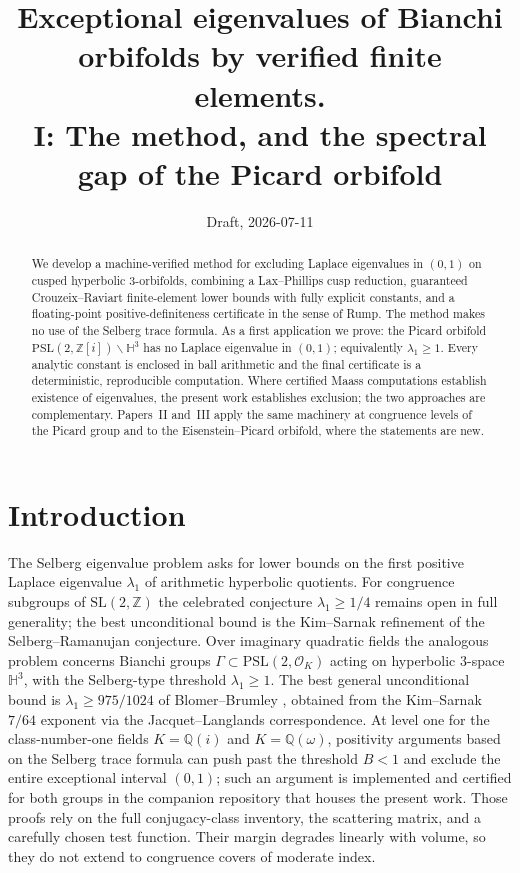 \documentclass[11pt]{amsart}
\title[Verified exclusion of exceptional eigenvalues, I]{Exceptional
eigenvalues of Bianchi orbifolds by verified finite elements.\\
I: The method, and the spectral gap of the Picard orbifold}
\author{}
\date{Draft, 2026-07-11}
\newcommand{\HH}{\mathbb{H}^3}
\newcommand{\ZZ}{\mathbb{Z}}
\newcommand{\PSL}{\mathrm{PSL}}
\begin{document}
\begin{abstract}
We develop a machine-verified method for excluding Laplace eigenvalues
in $(0,1)$ on cusped hyperbolic $3$-orbifolds, combining a
Lax--Phillips cusp reduction, guaranteed Crouzeix--Raviart
finite-element lower bounds with fully explicit constants, and a
floating-point positive-definiteness certificate in the sense of Rump.
The method makes no use of the Selberg trace formula.  As a first
application we prove: the Picard orbifold
$\PSL(2,\ZZ[i])\backslash\HH$ has no Laplace eigenvalue in
$(0,1)$; equivalently $\lambda_1\ge 1$.  Every analytic constant is
enclosed in ball arithmetic and the final certificate is a
deterministic, reproducible computation.  Where certified Maass
computations establish existence of eigenvalues, the present work
establishes exclusion; the two approaches are complementary.  Papers~II
and~III apply the same machinery at congruence levels of the Picard
group and to the Eisenstein--Picard orbifold, where the statements are
new.
\end{abstract}
\maketitle

\section{Introduction}

The Selberg eigenvalue problem asks for lower bounds on the first
positive Laplace eigenvalue $\lambda_1$ of arithmetic hyperbolic
quotients.  For congruence subgroups of $\mathrm{SL}(2,\ZZ)$ the
celebrated conjecture $\lambda_1\ge 1/4$ remains open in full
generality; the best unconditional bound is the Kim--Sarnak refinement
of the Selberg--Ramanujan conjecture.  Over imaginary quadratic fields
the analogous problem concerns Bianchi groups
$\Gamma\subset\PSL(2,\mathcal{O}_K)$ acting on hyperbolic $3$-space
$\HH$, with the Selberg-type threshold $\lambda_1\ge 1$.  The best
general unconditional bound is $\lambda_1\ge 975/1024$ of
Blomer--Brumley \cite{BB11}, obtained from the Kim--Sarnak $7/64$
exponent via the Jacquet--Langlands correspondence.  At level one for
the class-number-one fields $K=\mathbb{Q}(i)$ and $K=\mathbb{Q}(\omega)$,
positivity arguments based on the Selberg trace formula can push past
the threshold $B<1$ and exclude the entire exceptional interval $(0,1)$;
such an argument is implemented and certified for both groups in the
companion repository that houses the present work.  Those proofs rely
on the full conjugacy-class inventory, the scattering matrix, and a
carefully chosen test function.  Their margin degrades linearly with
volume, so they do not extend to congruence covers of moderate index.
\end{document}
